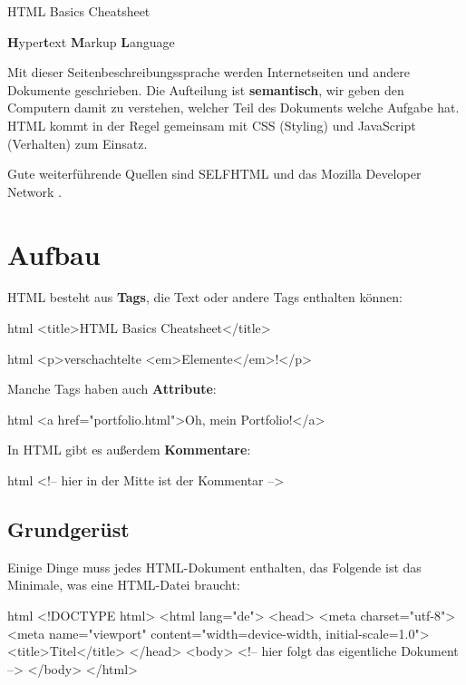 \documentclass[10pt,a4paper]{article}
\begin{document}
{\color{accentcolor}HTML Basics Cheatsheet}

\begin{multicols}{3}

\scriptsize

\textbf{H}yper\textbf{t}ext \textbf{M}arkup \textbf{L}anguage

Mit dieser Seitenbeschreibungssprache werden Internetseiten und andere Dokumente geschrieben. Die Aufteilung ist \textbf{semantisch}, wir geben den Computern damit zu verstehen, welcher Teil des Dokuments welche Aufgabe hat. HTML kommt in der Regel gemeinsam mit CSS (Styling) und JavaScript (Verhalten) zum Einsatz.

Gute weiterführende Quellen sind SELFHTML \cite{selfhtml} und das Mozilla Developer Network \cite{mdn}.

\section*{Aufbau}


\vspace{5mm}

HTML besteht aus \textbf{Tags}, die Text oder andere Tags enthalten können:
\begin{codebox}{html}{}
<title>HTML Basics Cheatsheet</title>
\end{codebox}
\begin{codebox}{html}{}
<p>verschachtelte <em>Elemente</em>!</p>
\end{codebox}

Manche Tags haben auch \textbf{Attribute}:
\begin{codebox}{html}{}
<a href="portfolio.html">Oh, mein Portfolio!</a>
\end{codebox}

In HTML gibt es außerdem \textbf{Kommentare}:
\begin{codebox}{html}{}
<!-- hier in der Mitte ist der Kommentar -->
\end{codebox}


\subsection*{Grundgerüst}
Einige Dinge muss jedes HTML-Dokument enthalten, das Folgende ist das Minimale, was eine HTML-Datei braucht:
\begin{codebox}{html}{}
<!DOCTYPE html>
<html lang="de">
  <head>
    <meta charset="utf-8">
    <meta name="viewport" content="width=device-width, initial-scale=1.0">
    <title>Titel</title>
  </head>
  <body>
    <!-- hier folgt das eigentliche Dokument -->
  </body>
</html>
\end{codebox}



\end{multicols}
\end{document}
